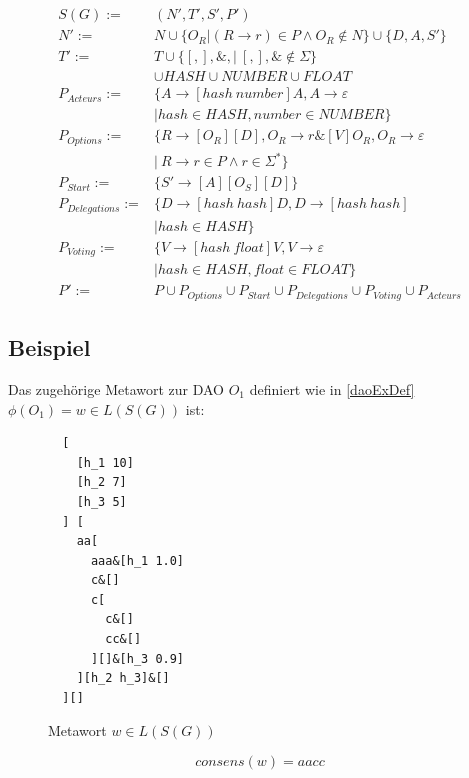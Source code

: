 \documentclass[a4paper,12pt]{report}
\begin{document}
\begin{align}
  S(G) :=& (N', T', S', P') \\
  N' :=& N \cup \{ O_R | (R\rightarrow r)\in P\land O_R \notin N\}\cup\{D, A, S'\}\\
  T' :=& T \cup \{[ , ], \&, |\ [,],\& \notin \Sigma \} \nonumber\\
  &\cup HASH
  \cup NUMBER
  \cup FLOAT 
  \\
  P_{Acteurs} :=& \{A\rightarrow[hash\ number]A,A\rightarrow \varepsilon \\
  &| hash\in HASH, number\in NUMBER\} \\
  P_{Options} :=& \{R \rightarrow [O_R][D], O_R \rightarrow r\& [V] O_R, O_R \rightarrow \varepsilon \ \nonumber\\
  &\vert\ R\rightarrow r\in P \land r\in \Sigma^*\} \\
  P_{Start} :=& \{S'\rightarrow [A][O_S][D]\} \\
  P_{Delegations} :=& \{D\rightarrow [hash\ hash]D,D\rightarrow [hash\ hash]\nonumber\\&| hash\in HASH\} \\
  P_{Voting} :=& \{V\rightarrow [hash\ float]V, V \rightarrow \varepsilon \nonumber \\&| hash\in HASH, float\in FLOAT\} \\
  P' :=& P
  \cup P_{Options} 
  \cup P_{Start} 
  \cup P_{Delegations} 
  \cup P_{Voting} 
  \cup P_{Acteurs}
\end{align}

\subsection*{Beispiel}
Das zugehörige Metawort zur DAO $O_1$ definiert wie in \ref{daoExDef} $\phi(O_1) = w \in L(S(G))$ ist:

\begin{figure}[ht]
  \centering
  \begin{lstlisting}
  [
    [h_1 10]
    [h_2 7]
    [h_3 5]
  ] [
    aa[
      aaa&[h_1 1.0]
      c&[]
      c[
        c&[]
        cc&[]
      ][]&[h_3 0.9]
    ][h_2 h_3]&[]
  ][]
  \end{lstlisting}
    \caption{Metawort $w\in L(S(G))$}
    \label{metaword}
\end{figure}

\[ consens(w) = aacc \] 




\end{document}
